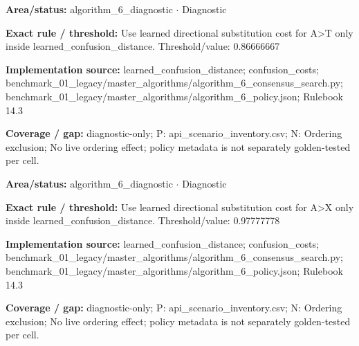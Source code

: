 \begin{tcolorbox}[enhanced,breakable,colback=white,colframe=Muted!45,boxrule=0.45pt,arc=1.5pt,left=6pt,right=6pt,top=5pt,bottom=5pt,title={\texttt{A6-LEARNED-SUBSTITUTION-A-T}},title after break={\texttt{A6-LEARNED-SUBSTITUTION-A-T}\ (continued)},fonttitle=\headingfont\bfseries\color{Navy},coltitle=Navy]
\textbf{Area/status:} algorithm\_\allowbreak{}6\_\allowbreak{}diagnostic $\boldsymbol{\cdot}$ Diagnostic\par
\smallskip
\textbf{Exact rule / threshold:} Use learned directional substitution cost for A>T only inside learned\_\allowbreak{}confusion\_\allowbreak{}distance. Threshold/\allowbreak{}value: 0.86666667\par
\smallskip
\textbf{Implementation source:} learned\_\allowbreak{}confusion\_\allowbreak{}distance; confusion\_\allowbreak{}costs; benchmark\_\allowbreak{}01\_\allowbreak{}legacy/\allowbreak{}master\_\allowbreak{}algorithms/\allowbreak{}algorithm\_\allowbreak{}6\_\allowbreak{}consensus\_\allowbreak{}search.py; benchmark\_\allowbreak{}01\_\allowbreak{}legacy/\allowbreak{}master\_\allowbreak{}algorithms/\allowbreak{}algorithm\_\allowbreak{}6\_\allowbreak{}policy.json; Rulebook 14.3\par
\smallskip
\textbf{Coverage / gap:} diagnostic-only; P: api\_\allowbreak{}scenario\_\allowbreak{}inventory.csv; N: Ordering exclusion; No live ordering effect; policy metadata is not separately golden-tested per cell.
\end{tcolorbox}
\begin{tcolorbox}[enhanced,breakable,colback=white,colframe=Muted!45,boxrule=0.45pt,arc=1.5pt,left=6pt,right=6pt,top=5pt,bottom=5pt,title={\texttt{A6-LEARNED-SUBSTITUTION-A-X}},title after break={\texttt{A6-LEARNED-SUBSTITUTION-A-X}\ (continued)},fonttitle=\headingfont\bfseries\color{Navy},coltitle=Navy]
\textbf{Area/status:} algorithm\_\allowbreak{}6\_\allowbreak{}diagnostic $\boldsymbol{\cdot}$ Diagnostic\par
\smallskip
\textbf{Exact rule / threshold:} Use learned directional substitution cost for A>X only inside learned\_\allowbreak{}confusion\_\allowbreak{}distance. Threshold/\allowbreak{}value: 0.97777778\par
\smallskip
\textbf{Implementation source:} learned\_\allowbreak{}confusion\_\allowbreak{}distance; confusion\_\allowbreak{}costs; benchmark\_\allowbreak{}01\_\allowbreak{}legacy/\allowbreak{}master\_\allowbreak{}algorithms/\allowbreak{}algorithm\_\allowbreak{}6\_\allowbreak{}consensus\_\allowbreak{}search.py; benchmark\_\allowbreak{}01\_\allowbreak{}legacy/\allowbreak{}master\_\allowbreak{}algorithms/\allowbreak{}algorithm\_\allowbreak{}6\_\allowbreak{}policy.json; Rulebook 14.3\par
\smallskip
\textbf{Coverage / gap:} diagnostic-only; P: api\_\allowbreak{}scenario\_\allowbreak{}inventory.csv; N: Ordering exclusion; No live ordering effect; policy metadata is not separately golden-tested per cell.
\end{tcolorbox}
